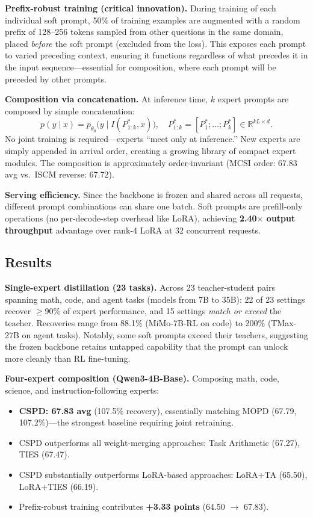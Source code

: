 \documentclass[11pt,a4paper]{article}
\begin{document}
\textbf{Prefix-robust training (critical innovation).} During training of each individual soft prompt, 50\% of training examples are augmented with a random prefix of 128--256 tokens sampled from other questions in the same domain, placed \emph{before} the soft prompt (excluded from the loss). This exposes each prompt to varied preceding context, ensuring it functions regardless of what precedes it in the input sequence---essential for composition, where each prompt will be preceded by other prompts.

\textbf{Composition via concatenation.} At inference time, $k$ expert prompts are composed by simple concatenation:
\[
  p(y \mid x) = p_{\theta_0}\bigl(y \mid I(P_{1:k}^*, x)\bigr), \quad P_{1:k}^* = [P_1^*; \ldots; P_k^*] \in \mathbb{R}^{kL \times d}.
\]
No joint training is required---experts ``meet only at inference.'' New experts are simply appended in arrival order, creating a growing library of compact expert modules. The composition is approximately order-invariant (MCSI order: 67.83 avg vs.\ ISCM reverse: 67.72).

\textbf{Serving efficiency.} Since the backbone is frozen and shared across all requests, different prompt combinations can share one batch. Soft prompts are prefill-only operations (no per-decode-step overhead like LoRA), achieving \textbf{2.40$\times$ output throughput} advantage over rank-4 LoRA at 32 concurrent requests.

\subsection{Results}
\textbf{Single-expert distillation (23 tasks).} Across 23 teacher-student pairs spanning math, code, and agent tasks (models from 7B to 35B): 22 of 23 settings recover $\geq$90\% of expert performance, and 15 settings \emph{match or exceed} the teacher. Recoveries range from 88.1\% (MiMo-7B-RL on code) to 200\% (TMax-27B on agent tasks). Notably, some soft prompts exceed their teachers, suggesting the frozen backbone retains untapped capability that the prompt can unlock more cleanly than RL fine-tuning.

\textbf{Four-expert composition (Qwen3-4B-Base).} Composing math, code, science, and instruction-following experts:
\begin{itemize}
  \item \textbf{CSPD: 67.83 avg} (107.5\% recovery), essentially matching MOPD (67.79, 107.2\%)---the strongest baseline requiring joint retraining.
  \item CSPD outperforms all weight-merging approaches: Task Arithmetic (67.27), TIES (67.47).
  \item CSPD substantially outperforms LoRA-based approaches: LoRA+TA (65.50), LoRA+TIES (66.19).
  \item Prefix-robust training contributes \textbf{+3.33 points} (64.50 $\rightarrow$ 67.83).
\end{itemize}
\end{document}
